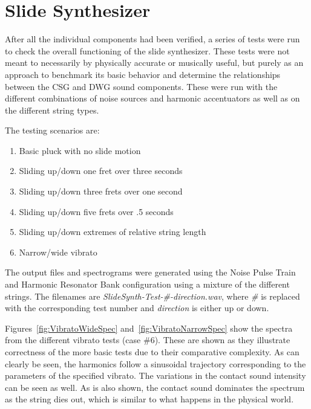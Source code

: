 \documentclass[../main.tex]{subfiles}
\begin{document}

\section{Slide Synthesizer}
After all the individual components had been verified, a series of tests were run to check the overall functioning of the slide synthesizer. These tests were not meant to necessarily by physically accurate or musically useful, but purely as an approach to benchmark its basic behavior and determine the relationships between the CSG and DWG sound components. These were run with the different combinations of noise sources and harmonic accentuators as well as on the different string types. 

The testing scenarios are:
\begin{enumerate}
    \item Basic pluck with no slide motion
    \item Sliding up/down one fret over three seconds
    \item Sliding up/down three frets over one second
    \item Sliding up/down five frets over .5 seconds
    \item Sliding up/down extremes of relative string length
    \item Narrow/wide vibrato
\end{enumerate}
The output files and spectrograms were generated using the Noise Pulse Train and Harmonic Resonator Bank configuration using a mixture of the different strings. The filenames are \emph{SlideSynth-Test-\#-direction.wav}, where \emph{\#} is replaced with the corresponding test number and \emph{direction} is either up or down.

Figures~\ref{fig:VibratoWideSpec} and~\ref{fig:VibratoNarrowSpec} show the spectra from the different vibrato tests (case \#6). These are shown as they illustrate correctness of the more basic tests due to their comparative complexity. As can clearly be seen, the harmonics follow a sinusoidal trajectory corresponding to the parameters of the specified vibrato. The variations in the contact sound intensity can be seen as well. As is also shown, the contact sound dominates the spectrum as the string dies out, which is similar to what happens in the physical world.
\end{document}
